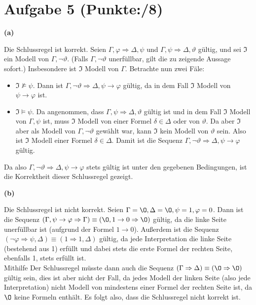 \documentclass[11pt, a4paper]{article}
\newcommand{\pppp}{8}
\begin{document}
\section*{Aufgabe 5 (Punkte:\qquad/\pppp)}
\textbf{(a)}
\begin{adjustwidth}{20pt}{20pt}
Die Schlussregel ist korrekt. Seien $\Gamma,\varphi \Rightarrow \Delta,\psi$ und $\Gamma,\psi \Rightarrow \Delta,\vartheta$ gültig, und sei $\mathfrak{I}$ ein Modell von
$\Gamma, \neg \vartheta$. (Falls $\Gamma, \neg \vartheta$ unerfüllbar, gilt die zu zeigende Aussage sofort.) Insbesondere ist $\mathfrak{I}$ Modell von $\Gamma$. Betrachte
nun zwei Fäle:
\begin{itemize}
\item $\mathfrak{I} \not\models \psi$. Dann ist $\Gamma, \neg \vartheta \Rightarrow \Delta, \psi \rightarrow \varphi$ gültig, da in dem Fall $\mathfrak{I}$ Modell von $\psi \rightarrow
	\varphi$ ist.
\item $\mathfrak{I} \models \psi$. Da angenommen, dass $\Gamma,\psi \Rightarrow \Delta,\vartheta$ gültig ist und in dem Fall $\mathfrak{I}$ Modell von $\Gamma,\psi$ ist, muss
	$\mathfrak{I}$ Modell von einer Formel $\delta \in \Delta$ oder von $\vartheta$. Da aber $\mathfrak{I}$ aber als Modell von $\Gamma, \neg \vartheta$ gewählt war,
	kann $\mathfrak{I}$ kein Modell von $\vartheta$ sein. Also ist $\mathfrak{I}$ Modell einer Formel $\delta \in \Delta$. Damit ist die Sequenz $\Gamma, \neg \vartheta
	\Rightarrow \Delta, \psi \rightarrow \varphi$ gültig.
\end{itemize}
Da also $\Gamma, \neg \vartheta \Rightarrow \Delta, \psi \rightarrow \varphi$ stets gültig ist unter den gegebenen Bedingungen, ist die Korrektheit dieser Schlussregel gezeigt.
\end{adjustwidth}
\textbf{(b)}
\begin{adjustwidth}{20pt}{20pt}
Die Schlussregel ist nicht korrekt. Seien $\Gamma=\O, \Delta=\O, \psi = 1, \varphi = 0$. Dann ist die Sequenz $(\Gamma,\psi \rightarrow \varphi \Rightarrow \Gamma)\equiv
(\O,1 \rightarrow 0 \Rightarrow \O)$ gültig, da die linke Seite unerfüllbar ist (aufgrund der Formel $1 \rightarrow 0$). Außerdem ist die Sequenz $(\neg \varphi \Rightarrow
\psi, \Delta)\equiv(1 \Rightarrow 1,\Delta)$ gültig, da jede Interpretation die linke Seite (bestehend aus 1) erfüllt und dabei stets die erste Formel der rechten Seite, ebenfalls 1,
stets erfüllt ist.\\
Mithilfe Der Schlussregel müsste dann auch die Sequenz $(\Gamma \Rightarrow \Delta)\equiv(\O \Rightarrow \O)$ gültig sein, dies ist aber nicht der Fall, da jedes Modell der linken
Seite (also jede Interpretation) nicht Modell von mindestens einer Formel der rechten Seite ist, da $\O$ keine Formeln enthält. Es folgt also, dass die Schlussregel nicht korrekt ist.
\end{adjustwidth}
\end{document}
